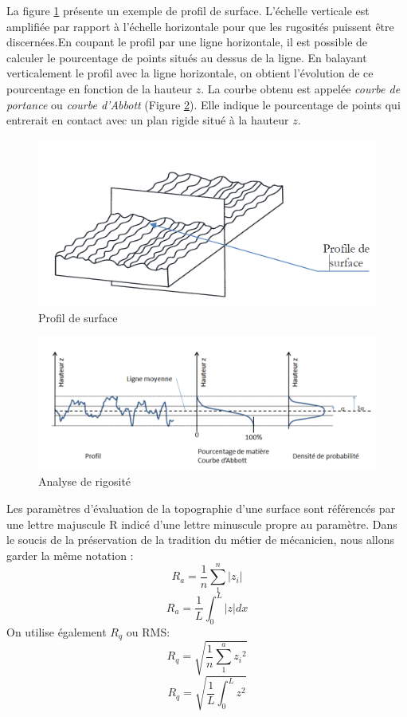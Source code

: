 La figure \ref{fig:profil-surface} présente un exemple de profil de surface. L’échelle verticale est amplifiée par rapport à l’échelle horizontale pour que les rugosités puissent être discernées.En coupant le profil par une ligne horizontale, il est possible de calculer le pourcentage de points situés au dessus de la ligne. En balayant verticalement le profil avec la ligne horizontale, on obtient l’évolution de ce pourcentage en fonction de la hauteur $z$. La courbe obtenu est appelée \emph{courbe de portance} ou \emph{courbe d'Abbott} (Figure \ref{fig:analysedistribution}). Elle indique le pourcentage de points qui entrerait en contact avec un plan rigide situé à la hauteur $z$.\cite{initiation}
\begin{figure}[h]
	\centering
	\includegraphics[width=0.7\linewidth]{"Img/profil surface"}
	\caption[profil surface]{Profil de surface}
	\label{fig:profil-surface}
\end{figure}
\begin{figure}[h]
	\centering
	\includegraphics[width=0.7\linewidth]{Img/analysedistribution}
	\caption[analyseRigosité]{Analyse de rigosité}
	\label{fig:analysedistribution}
\end{figure}

Les paramètres d’évaluation de la topographie d’une surface sont référencés par une lettre majuscule R indicé d’une lettre minuscule propre au paramètre. Dans le soucis de la préservation de la tradition du métier de mécanicien, nous allons garder la même notation :
\begin{equation}
	{R}_{a}=\frac{1}{n}\sum _{1}^{n}\left|z_i\right|
	\label{Ra}
\end{equation}
\begin{equation}
	{R}_{a}=\frac{1}{L}{\int }_{0}^{L}\left|z\right|dx
\end{equation}
On utilise également $R_q$ ou RMS:
\begin{equation}
		{R}_{q}=\sqrt{\frac{1}{n}\sum _{1}^{a}{z_i}^{2}}
\end{equation}
\begin{equation}
		{R}_{q}=\sqrt{\frac{1}{L}{\int }_{0}^{L}{z}^{2}}
\end{equation}

